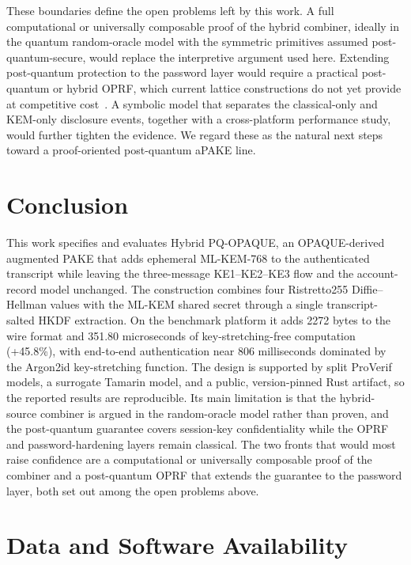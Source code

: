 \documentclass{ieeeijc}
\theoremstyle{remark}
\begin{document}
These boundaries define the open problems left by this work. A full
computational or universally composable proof of the hybrid combiner, ideally in
the quantum random-oracle model with the symmetric primitives assumed
post-quantum-secure, would replace the interpretive argument used here.
Extending post-quantum protection to the password layer would require a
practical post-quantum or hybrid OPRF, which current lattice constructions do
not yet provide at competitive cost~\cite{esgin2024}. A symbolic model that
separates the classical-only and KEM-only disclosure events, together with a
cross-platform performance study, would further tighten the evidence. We regard
these as the natural next steps toward a proof-oriented post-quantum aPAKE line.

\section{Conclusion}

This work specifies and evaluates Hybrid PQ-OPAQUE, an OPAQUE-derived augmented
PAKE that adds ephemeral ML-KEM-768 to the authenticated transcript while leaving
the three-message KE1--KE2--KE3 flow and the account-record model unchanged. The
construction combines four Ristretto255 Diffie--Hellman values with the ML-KEM
shared secret through a single transcript-salted HKDF extraction. On the
benchmark platform it adds 2272 bytes to the wire format and 351.80
microseconds of key-stretching-free computation (+45.8\%), with
end-to-end authentication near 806 milliseconds dominated by the Argon2id
key-stretching function. The design is supported by split ProVerif models, a
surrogate Tamarin model, and a public, version-pinned Rust artifact, so the
reported results are reproducible. Its main limitation is that the hybrid-source
combiner is argued in the random-oracle model rather than proven, and the
post-quantum guarantee covers session-key confidentiality while the OPRF and
password-hardening layers remain classical. The two fronts that would most raise confidence are a computational or
universally composable proof of the combiner and a post-quantum OPRF that extends
the guarantee to the password layer, both set out among the open problems above.

\section*{Data and Software Availability}
\end{document}

